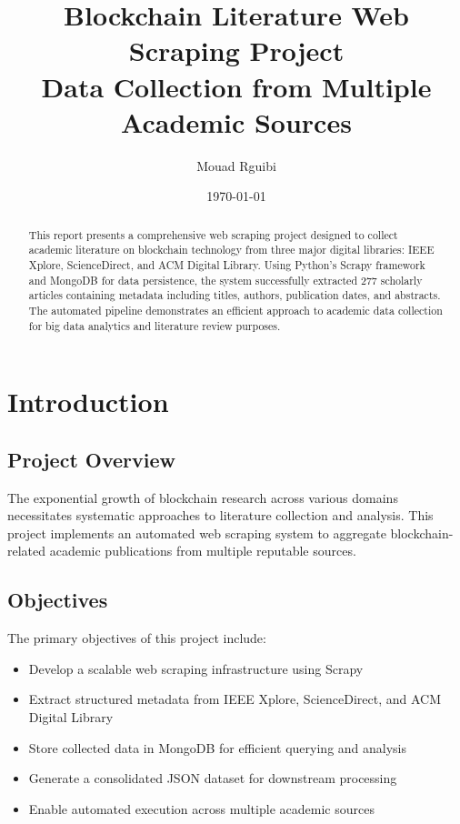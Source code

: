\documentclass[12pt,a4paper]{article}
\title{\textbf{Blockchain Literature Web Scraping Project}\\
\Large Data Collection from Multiple Academic Sources}
\author{Mouad Rguibi}
\date{\today}
\begin{document}
\maketitle

\begin{abstract}
This report presents a comprehensive web scraping project designed to collect academic literature on blockchain technology from three major digital libraries: IEEE Xplore, ScienceDirect, and ACM Digital Library. Using Python's Scrapy framework and MongoDB for data persistence, the system successfully extracted 277 scholarly articles containing metadata including titles, authors, publication dates, and abstracts. The automated pipeline demonstrates an efficient approach to academic data collection for big data analytics and literature review purposes.
\end{abstract}

\tableofcontents
\newpage

\section{Introduction}

\subsection{Project Overview}
The exponential growth of blockchain research across various domains necessitates systematic approaches to literature collection and analysis. This project implements an automated web scraping system to aggregate blockchain-related academic publications from multiple reputable sources.

\subsection{Objectives}
The primary objectives of this project include:
\begin{itemize}[itemsep=0.5em]
    \item Develop a scalable web scraping infrastructure using Scrapy
    \item Extract structured metadata from IEEE Xplore, ScienceDirect, and ACM Digital Library
    \item Store collected data in MongoDB for efficient querying and analysis
    \item Generate a consolidated JSON dataset for downstream processing
    \item Enable automated execution across multiple academic sources
\end{itemize}
\end{document}
